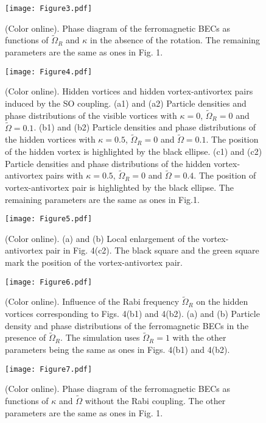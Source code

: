 \documentclass[aps,pra,showpacs,twocolumn,superscriptaddress]{revtex4-1}
\begin{document}
\begin{figure}
\texttt{[image: Figure3.pdf]}
\caption{(Color online). Phase diagram of the ferromagnetic BECs as functions of $\widetilde{\Omega}_{R}$ and $\kappa$ in the absence of the rotation.
The remaining parameters are the same as ones in Fig. 1.} \label{Figure3}
\end{figure}

\begin{figure}
\texttt{[image: Figure4.pdf]}
\caption{(Color online). Hidden vortices and hidden vortex-antivortex pairs induced by the SO coupling. (a1) and (a2) Particle densities and phase distributions of the  visible vortices with $\kappa=0$, $\tilde{\Omega}_{R}=0$ and $\tilde{\Omega}=0.1$. (b1) and (b2) Particle densities and phase distributions of the hidden vortices with $\kappa=0.5$, $\tilde{\Omega}_{R}=0$ and $\tilde{\Omega}=0.1$. The position of the hidden vortex is highlighted by the black ellipse. (c1) and (c2) Particle densities and phase distributions of the hidden vortex-antivortex pairs with $\kappa=0.5$, $\tilde{\Omega}_{R}=0$ and $\tilde{\Omega}=0.4$. The position of vortex-antivortex pair is highlighted by the black ellipse. The remaining parameters are the same as ones
in Fig.1.} \label{Figure4}
\end{figure}

\begin{figure}
\texttt{[image: Figure5.pdf]}
\caption{(Color online). (a) and (b) Local enlargement of the vortex-antivortex
pair in Fig. 4(c2). The black square and the green square mark the position of
the vortex-antivortex
pair.} \label{Figure5}
\end{figure}

\begin{figure}
\texttt{[image: Figure6.pdf]}
\caption{(Color online). Influence of the Rabi frequency $\widetilde{\Omega}_{R}$ on the hidden vortices corresponding to Figs. 4(b1) and 4(b2). (a) and (b) Particle density and phase distributions of the ferromagnetic BECs in the presence of $\widetilde{\Omega}_{R}$. The simulation uses $\widetilde{\Omega}_{R}=1$ with the other parameters being the same as ones in Figs. 4(b1) and 4(b2).} \label{Figure6}
\end{figure}

\begin{figure}
\texttt{[image: Figure7.pdf]}
\caption{(Color online). Phase diagram of the ferromagnetic BECs as functions of $\kappa$ and $\tilde{\Omega}$ without the Rabi coupling. The other parameters are the same as ones in Fig. 1.} \label{Figure7}
\end{figure}
\end{document}
